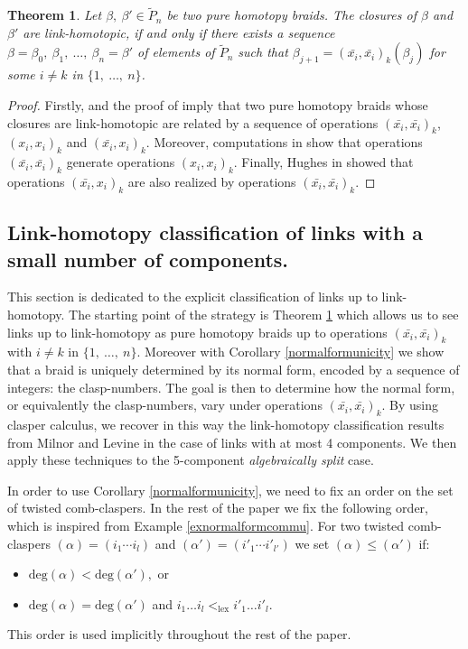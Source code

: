 \documentclass[11pt, a4paper, twoside,reqno]{amsart}
\newtheorem{thm}{Theorem}[section]
\newcommand\degg{\mathord{\mathrm{deg}}}
\newcommand\lex{\mathord{\mathrm{lex}}}
\begin{document}
\begin{thm}\label{thmHabLin}\cite{HabeggerLinHomotopy,Hughespartial} Let $\beta,\ \beta'\in\tilde{P}_n$ be two pure homotopy braids. The closures of $\beta$ and $\beta'$ are link-homotopic, if and only if there exists a sequence $\beta=\beta_0,\ \beta_1,\ \ldots,\ \beta_n=\beta'$ of elements of $\tilde P_n$ such that $\beta_{j+1}=(\bar{x_i},\bar{x_i})_k(\beta_j)$ for some $i\neq k$ in $\{1,\ \ldots,\ n\}$.
\end{thm}
\begin{proof}
Firstly, \cite[Lemma 2.11]{HabeggerLinHomotopy} and the proof of \cite[Theorem 2.13]{HabeggerLinHomotopy} imply that two pure homotopy braids whose closures are link-homotopic are related by a sequence of operations $(\bar{x_i},\bar{x_i})_k$, $({x_i},{x_i})_k$ and $(\bar{x_i},{x_i})_k$. Moreover, computations in \cite[pp.~413]{HabeggerLinHomotopy} show that operations $(\bar{x_i},\bar{x_i})_k$ generate operations $({x_i},{x_i})_k$. Finally, Hughes in \cite{Hughespartial} showed that operations $(\bar{x_i},{x_i})_k$ are also realized by operations $(\bar{x_i},\bar{x_i})_k$.
\end{proof}

\subsection{Link-homotopy classification of links with a small number of components.}

This section is dedicated to the explicit classification of links up to link-homotopy. The starting point of the strategy is Theorem \ref{thmHabLin} which allows us to see links up to link-homotopy as pure homotopy braids up to operations $(\bar{x_i},\bar{x_i})_k$ with $i\neq k$ in $\{1,\ \ldots,\ n\}$. Moreover with Corollary \ref{normalformunicity} we show that a braid is uniquely determined by its normal form, encoded by a sequence of integers: the clasp-numbers. The goal is then to determine how the normal form, or equivalently the clasp-numbers, vary under operations $(\bar{x_i},\bar{x_i})_k$. By using clasper calculus, we recover in this way the link-homotopy classification results from Milnor \cite{MilnorLinkgrp} and Levine \cite{Levine4comp} in the case of links with at most 4 components. We then apply these techniques to the 5-component \emph{algebraically split} case.

In order to use Corollary \ref{normalformunicity}, we need to fix an order on the set of twisted comb-claspers. In the rest of the paper we fix the following order, which is inspired from Example \ref{exnormalformcommu}. For two twisted comb-claspers $(\alpha)=(i_1\cdots i_l)$ and $(\alpha')=(i'_1\cdots i'_{l'})$ we set $(\alpha)\leq(\alpha')$ if:
\begin{itemize}
    \item $\degg(\alpha)<\degg(\alpha'),$ or
    \item $\degg(\alpha)=\degg(\alpha')$ and $i_1\ldots i_l<_{\lex}i'_1\ldots i'_l.$
\end{itemize} 
This order is used implicitly throughout the rest of the paper.
\end{document}
